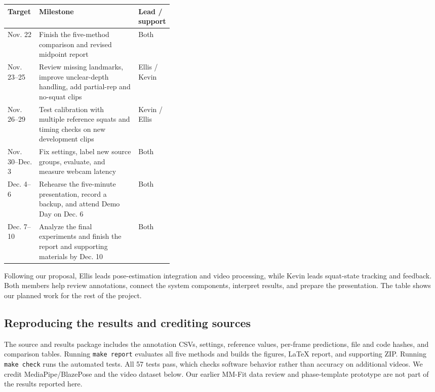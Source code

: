 \documentclass[10pt,letterpaper]{article}
\begin{document}
\begin{center}
\small
\begin{tabularx}{\linewidth}{@{}p{0.19\linewidth}Xp{0.19\linewidth}@{}}
\toprule
Target & Milestone & Lead / support\\
\midrule
Nov. 22 & Finish the five-method comparison and revised midpoint report & Both\\
Nov. 23--25 & Review missing landmarks, improve unclear-depth handling, add partial-rep and no-squat clips & Ellis / Kevin\\
Nov. 26--29 & Test calibration with multiple reference squats and timing checks on new development clips & Kevin / Ellis\\
Nov. 30--Dec. 3 & Fix settings, label new source groups, evaluate, and measure webcam latency & Both\\
Dec. 4--6 & Rehearse the five-minute presentation, record a backup, and attend Demo Day on Dec. 6 & Both\\
Dec. 7--10 & Analyze the final experiments and finish the report and supporting materials by Dec. 10 & Both\\
\bottomrule
\end{tabularx}
\end{center}

Following our proposal, Ellis leads pose-estimation integration and video
processing, while Kevin leads squat-state tracking and feedback. Both members
help review annotations, connect the system components, interpret results,
and prepare the presentation. The table shows our planned work for the
rest of the project.

\subsection*{Reproducing the results and crediting sources}
The source and results package includes the annotation CSVs, settings,
reference values, per-frame predictions, file and code hashes, and comparison
tables. Running \texttt{make report} evaluates all five methods and builds the
figures, LaTeX report, and supporting ZIP. Running \texttt{make check} runs the
automated tests. All 57 tests pass, which checks software behavior rather than
accuracy on additional videos. We credit MediaPipe/BlazePose and the video
dataset below. Our earlier MM-Fit data review and phase-template prototype
are not part of the results reported here.


\begingroup
\small

\endgroup
\end{document}
